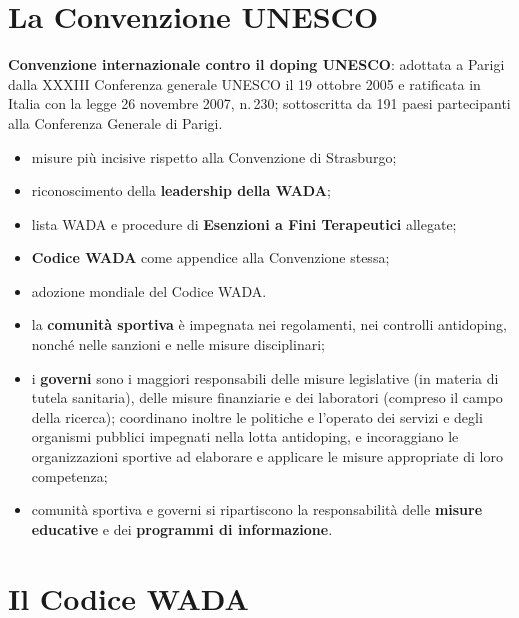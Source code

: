 \section{La Convenzione UNESCO}

\textbf{Convenzione internazionale contro il doping UNESCO}: adottata a Parigi dalla XXXIII
Conferenza generale UNESCO il 19 ottobre 2005 e ratificata in Italia con la legge 26 novembre
2007, n.\,230; sottoscritta da 191 paesi partecipanti alla Conferenza Generale di Parigi.

\begin{itemize}
  \item misure più incisive rispetto alla Convenzione di Strasburgo;
  \item riconoscimento della \textbf{leadership della WADA};
  \item lista WADA e procedure di \textbf{Esenzioni a Fini Terapeutici} allegate;
  \item \textbf{Codice WADA} come appendice alla Convenzione stessa;
  \item adozione mondiale del Codice WADA.
\end{itemize}

\begin{itemize}
  \item la \textbf{comunità sportiva} è impegnata nei regolamenti, nei controlli antidoping,
    nonché nelle sanzioni e nelle misure disciplinari;
  \item i \textbf{governi} sono i maggiori responsabili delle misure legislative (in materia di
    tutela sanitaria), delle misure finanziarie e dei laboratori (compreso il campo della
    ricerca); coordinano inoltre le politiche e l'operato dei servizi e degli organismi pubblici
    impegnati nella lotta antidoping, e incoraggiano le organizzazioni sportive ad elaborare e
    applicare le misure appropriate di loro competenza;
  \item comunità sportiva e governi si ripartiscono la responsabilità delle \textbf{misure
    educative} e dei \textbf{programmi di informazione}.
\end{itemize}

\section{Il Codice WADA}

